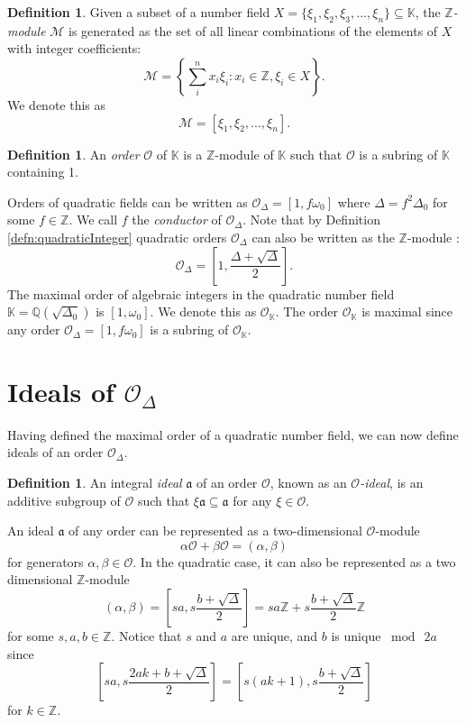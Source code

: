 \documentclass{ucalgthes1}
\theoremstyle{plain}
\theoremstyle{definition}
\newtheorem{defn}[thm]{Definition}
\newcommand{\KK}{\mathbb{K}}
\newcommand{\MM}{\mathcal{M}}
\newcommand{\OO}{\mathcal{O}}
\newcommand{\ZZ}{\mathbb{Z}}
\newcommand{\QQ}{\mathbb{Q}}
\begin{document}
\begin{defn}
Given a subset of a number field $X = \{ \xi_1, \xi_2, \xi_3, ..., \xi_n \} \subseteq \KK$, the \emph{$\ZZ$-module} $\MM$ is generated as the set of all linear combinations of the elements of $X$ with integer coefficients:
\[
	\MM = \left \{ \sum_{i}^n x_i \xi_i : x_i \in \ZZ, \xi_i \in X \right \}.
\]
We denote this as
\[
	\MM = [ \xi_1, \xi_2, ..., \xi_n ].
\]
\end{defn}

\begin{defn}
An \emph{order} $\OO$ of $\KK$ is a $\ZZ$-module of $\KK$ such that $\OO$ is a subring of $\KK$ containing 1.
\end{defn}

\noindent
Orders of quadratic fields can be written as  $\OO_\Delta = [1, f\omega_0]$ where $\Delta = f^2\Delta_0$ for some $f \in \ZZ$.  We call $f$ the \emph{conductor} of $\OO_\Delta$.  Note that by Definition \ref{defn:quadraticInteger} quadratic orders $\OO_\Delta$ can also be written as  the $\ZZ$-module  \cite[p.~81]{Jac09}:
\begin{equation*}
	\OO_\Delta = \left[1, \frac{\Delta + \sqrt{\Delta}}{2} \right].
\end{equation*}
The maximal order of algebraic integers in the quadratic number field $\KK=\QQ(\sqrt{\Delta_0})$ is $[1, \omega_0]$.  We denote this as $\OO_{\KK}$.  The order $\OO_\KK$ is maximal since any order $\OO_\Delta = [1,f\omega_0]$ is a subring of $\OO_\KK$. 


\bigbreak
\section{Ideals of $\OO_\Delta$}

Having defined the maximal order of a quadratic number field, we can now define ideals of an order $\OO_\Delta$.

\begin{defn}
An integral \emph{ideal} $\mathfrak{a}$ of an order $\OO$, known as an \emph{$\OO$-ideal}, is an additive subgroup of $\OO$ such that $\xi \mathfrak{a} \subseteq \mathfrak{a}$ for any $\xi \in \OO$.
\end{defn}

\noindent
An ideal $\mathfrak{a}$ of any order can be represented as a two-dimensional $\OO$-module
\[
	\alpha \OO + \beta \OO = (\alpha, \beta)
\]
for generators $\alpha, \beta \in \OO$.  In the quadratic case, it can also be represented as a two dimensional $\ZZ$-module
\begin{equation}
\label{eq:idealZModule}
	(\alpha, \beta) = \left[sa, s \frac{b+ \sqrt{\Delta}}{2} \right] = sa \ZZ + s\frac{b + \sqrt{\Delta}}{2} \ZZ
\end{equation}
for some $s, a, b \in \ZZ$.  Notice that $s$ and $a$ are unique, and $b$ is unique $\bmod~2a$ since
\begin{equation*}
	\left[sa, s\frac{2ak+b+\sqrt{\Delta}}{2}\right] = \left[s(ak+1), s\frac{b+\sqrt{\Delta}}{2}\right]
\end{equation*}
for $k \in \ZZ$.
\end{document}
